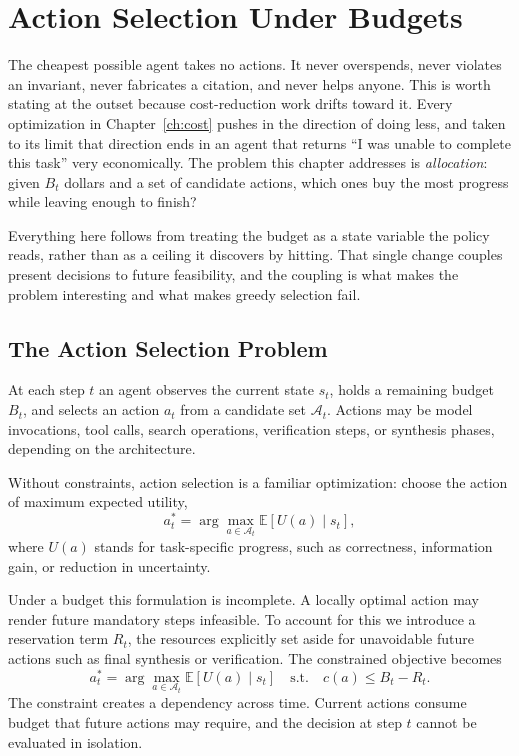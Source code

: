 \documentclass[11pt]{book}
\begin{document}
\chapter{Action Selection Under Budgets}
\label{ch:action-selection}

The cheapest possible agent takes no actions. It never overspends, never violates an invariant, never fabricates a citation, and never helps anyone. This is worth stating at the outset because cost-reduction work drifts toward it. Every optimization in Chapter~\ref{ch:cost} pushes in the direction of doing less, and taken to its limit that direction ends in an agent that returns ``I was unable to complete this task'' very economically. The problem this chapter addresses is \textit{allocation}: given $B_t$ dollars and a set of candidate actions, which ones buy the most progress while leaving enough to finish?

Everything here follows from treating the budget as a state variable the policy reads, rather than as a ceiling it discovers by hitting. That single change couples present decisions to future feasibility, and the coupling is what makes the problem interesting and what makes greedy selection fail.

\section{The Action Selection Problem}

At each step $t$ an agent observes the current state $s_t$, holds a remaining budget $B_t$, and selects an action $a_t$ from a candidate set $\mathcal{A}_t$. Actions may be model invocations, tool calls, search operations, verification steps, or synthesis phases, depending on the architecture.

Without constraints, action selection is a familiar optimization: choose the action of maximum expected utility,
\[
a^*_t = \arg\max_{a \in \mathcal{A}_t} \mathbb{E}[U(a) \mid s_t],
\]
where $U(a)$ stands for task-specific progress, such as correctness, information gain, or reduction in uncertainty.

Under a budget this formulation is incomplete. A locally optimal action may render future mandatory steps infeasible. To account for this we introduce a reservation term $R_t$, the resources explicitly set aside for unavoidable future actions such as final synthesis or verification. The constrained objective becomes
\[
a^*_t = \arg\max_{a \in \mathcal{A}_t} \mathbb{E}[U(a) \mid s_t] \quad \text{s.t.} \quad c(a) \leq B_t - R_t.
\]
The constraint creates a dependency across time. Current actions consume budget that future actions may require, and the decision at step $t$ cannot be evaluated in isolation.
\end{document}
